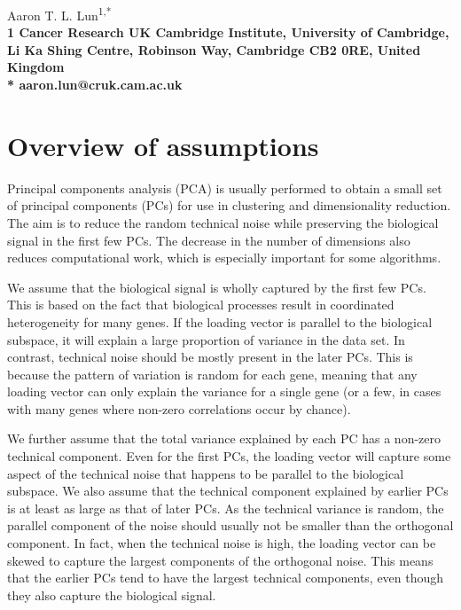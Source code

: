 \documentclass{article}
\begin{document}
\vspace*{0.35in}

\begin{flushleft}
{\Large
\textbf{}
}
\newline

Aaron T. L. Lun\textsuperscript{1,*}
\\
\bigskip
\bf{1} Cancer Research UK Cambridge Institute, University of Cambridge, Li Ka Shing Centre, Robinson Way, Cambridge CB2 0RE, United Kingdom
\\
\bigskip
* aaron.lun@cruk.cam.ac.uk

\end{flushleft}

\section{Overview of assumptions}
Principal components analysis (PCA) is usually performed to obtain a small set of principal components (PCs) for use in clustering and dimensionality reduction.
The aim is to reduce the random technical noise while preserving the biological signal in the first few PCs.
The decrease in the number of dimensions also reduces computational work, which is especially important for some algorithms.

We assume that the biological signal is wholly captured by the first few PCs.
This is based on the fact that biological processes result in coordinated heterogeneity for many genes.
If the loading vector is parallel to the biological subspace, it will explain a large proportion of variance in the data set.
In contrast, technical noise should be mostly present in the later PCs.
This is because the pattern of variation is random for each gene, meaning that any loading vector can only explain the variance for a single gene (or a few, in cases with many genes where non-zero correlations occur by chance).

We further assume that the total variance explained by each PC has a non-zero technical component.
Even for the first PCs, the loading vector will capture some aspect of the technical noise that happens to be parallel to the biological subspace.
We also assume that the technical component explained by earlier PCs is at least as large as that of later PCs.
As the technical variance is random, the parallel component of the noise should usually not be smaller than the orthogonal component.
In fact, when the technical noise is high, the loading vector can be skewed to capture the largest components of the orthogonal noise.
This means that the earlier PCs tend to have the largest technical components, even though they also capture the biological signal.
\end{document}
